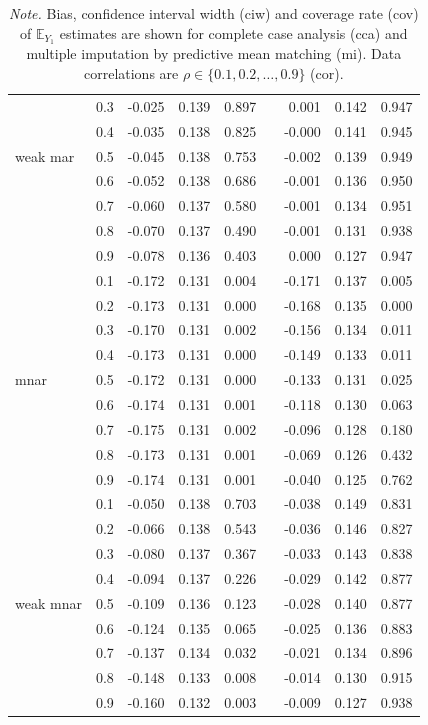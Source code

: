 \documentclass[11pt,a4paper]{article}
\begin{document}
\begin{table}[h!]
\begin{tabular}{lrrrrrrrr}
   & 0.3 & -0.025 & 0.139 & 0.897 &  & 0.001 & 0.142 & 0.947 \\ 
   & 0.4 & -0.035 & 0.138 & 0.825 &  & -0.000 & 0.141 & 0.945 \\ 
  weak mar & 0.5 & -0.045 & 0.138 & 0.753 &  & -0.002 & 0.139 & 0.949 \\ 
   & 0.6 & -0.052 & 0.138 & 0.686 &  & -0.001 & 0.136 & 0.950 \\ 
   & 0.7 & -0.060 & 0.137 & 0.580 &  & -0.001 & 0.134 & 0.951 \\ 
   & 0.8 & -0.070 & 0.137 & 0.490 &  & -0.001 & 0.131 & 0.938 \\ 
   & 0.9 & -0.078 & 0.136 & 0.403 &  & 0.000 & 0.127 & 0.947 \\ 
   \cline{2-9}
   & 0.1 & -0.172 & 0.131 & 0.004 &  & -0.171 & 0.137 & 0.005 \\ 
   & 0.2 & -0.173 & 0.131 & 0.000 &  & -0.168 & 0.135 & 0.000 \\ 
   & 0.3 & -0.170 & 0.131 & 0.002 &  & -0.156 & 0.134 & 0.011 \\ 
   & 0.4 & -0.173 & 0.131 & 0.000 &  & -0.149 & 0.133 & 0.011 \\ 
  mnar & 0.5 & -0.172 & 0.131 & 0.000 &  & -0.133 & 0.131 & 0.025 \\ 
   & 0.6 & -0.174 & 0.131 & 0.001 &  & -0.118 & 0.130 & 0.063 \\ 
   & 0.7 & -0.175 & 0.131 & 0.002 &  & -0.096 & 0.128 & 0.180 \\ 
   & 0.8 & -0.173 & 0.131 & 0.001 &  & -0.069 & 0.126 & 0.432 \\ 
   & 0.9 & -0.174 & 0.131 & 0.001 &  & -0.040 & 0.125 & 0.762 \\ 
   \cline{2-9}
   & 0.1 & -0.050 & 0.138 & 0.703 &  & -0.038 & 0.149 & 0.831 \\ 
   & 0.2 & -0.066 & 0.138 & 0.543 &  & -0.036 & 0.146 & 0.827 \\ 
   & 0.3 & -0.080 & 0.137 & 0.367 &  & -0.033 & 0.143 & 0.838 \\ 
   & 0.4 & -0.094 & 0.137 & 0.226 &  & -0.029 & 0.142 & 0.877 \\ 
  weak mnar & 0.5 & -0.109 & 0.136 & 0.123 &  & -0.028 & 0.140 & 0.877 \\ 
   & 0.6 & -0.124 & 0.135 & 0.065 &  & -0.025 & 0.136 & 0.883 \\ 
   & 0.7 & -0.137 & 0.134 & 0.032 &  & -0.021 & 0.134 & 0.896 \\ 
   & 0.8 & -0.148 & 0.133 & 0.008 &  & -0.014 & 0.130 & 0.915 \\ 
   & 0.9 & -0.160 & 0.132 & 0.003 &  & -0.009 & 0.127 & 0.938 \\ 
   \hline
\end{tabular}
\vspace{2mm}
\caption*{\footnotesize \textit{Note.} Bias, confidence interval width (ciw) and coverage rate (cov) of $\mathbb{E}_{Y_1}$ estimates are shown for complete case analysis (cca) and multiple imputation by predictive mean matching (mi). Data correlations are $\rho \in \{0.1, 0.2, \dots, 0.9\}$ (cor).}
\end{table}
\end{document}
